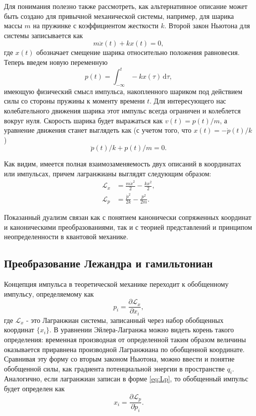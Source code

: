 \documentclass[14pt, a4paper]{extreport}
\newcommand{\diff}{\,\mathrm{d}}
\numberwithin{equation}{section}
\begin{document}
Для понимания полезно также рассмотреть, как альтернативное описание может быть создано для привычной механической системы, например, для шарика массы $m$ на пружинке с коэффициентом жесткости $k$. Второй закон Ньютона для системы записывается как
\begin{equation}
	m \ddot x(t) + k x(t) = 0,
\end{equation}
где $x(t)$ обозначает смещение шарика относительно положения равновесия. Теперь введем новую переменную
\begin{equation}
	p(t) = \int_{-\infty}^{t} - k x(\tau) \diff \tau,
\end{equation}
имеющую физический смысл импульса, накопленного шариком под действием силы со стороны пружины к моменту времени $ t $. Для интересующего нас колебательного движения шарика этот импульс всегда ограничен и колеблется вокруг нуля. Скорость шарика будет выражаться как $v(t) = p(t)/m$, а уравнение движения станет выглядеть как (с учетом того, что $ x(t) = - \dot p(t) / k $)
\begin{equation}
	\ddot p(t)/k + p(t)/m = 0.
\end{equation}

Как видим, имеется полная взаимозаменяемость двух описаний в координатах или импульсах, причем лагранжианы выглядят следующим образом:
\begin{align}
\mathcal{L}_x &= \frac{m \dot x^2}{2} - \frac{k x^2}{2},\\
\mathcal{L}_p &= \frac{\dot p^2}{2 k} - \frac{p^2}{2 m}.\label{eq:Lp}
\end{align}

Показанный дуализм связан как с понятием канонически сопряженных координат и каноническими преобразованиями, так и с теорией представлений и принципом неопределенности в квантовой механике.

\subsection{Преобразование Лежандра и гамильтониан}

Концепция импульса в теоретической механике переходит к обобщенному импульсу, определяемому как 
\begin{equation}
	p_i = \frac{\partial \mathcal{L}_x}{\partial \dot x_i},
\end{equation}
где $ \mathcal{L}_x $ - это Лагранжиан системы, записанный через набор обобщенных координат $\{x_i\}$. В уравнении Эйлера-Лагранжа можно видеть корень такого определения: временная производная от определенной таким образом величины оказывается приравнена производной Лагранжиана по обобщенной координате. Сравнивая эту форму со вторым законом Ньютона, можно ввести и понятие обобщенной силы, как градиента потенциальной энергии в пространстве $q_i$. Аналогично, если лагранжиан записан в форме \eqref{eq:Lp}, то обобщенный импульс будет определен как
\begin{equation}
x_i = \frac{\partial \mathcal{L}_p}{\partial \dot p_i}.
\end{equation}
\end{document}
